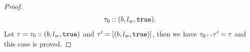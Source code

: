 \begin{proof}
\[{{    \mathtt{\tau}_0 :: (b, l_w, \mathtt{true})}}.
  \]
  Let $\mathtt{\tau} = \mathtt{\tau}_0 ::(b, l_w, \mathtt{true})$ and $\mathtt{\tau}' =  [(b, l_w, \mathtt{true})]$,
  then we have $\mathtt{\tau}_0 {\scriptscriptstyle ++} \mathtt{\tau}' = \mathtt{\tau}$ and this case is proved.

\end{proof}
